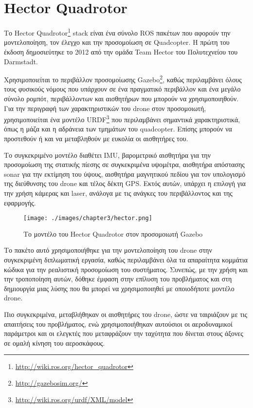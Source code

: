 \section{Hector Quadrotor}
\label{section:hector}

Το Hector Quadrotor\footnote{\href{http://wiki.ros.org/hector_quadrotor}{http://wiki.ros.org/hector\_quadrotor}} stack \cite{2012simpar_meyer} είναι ένα σύνολο ROS πακέτων που αφορούν την μοντελοποίηση, τον έλεγχο και την προσομοίωση σε Quadcopter. Η πρώτη του έκδοση δημοσιεύτηκε το 2012 από την ομάδα Team Hector του Πολυτεχνείου του Darmstadt.

Χρησιμοποιείται το περιβάλλον προσομοίωσης Gazebo\footnote{\href{http://gazebosim.org/}{http://gazebosim.org/}}, καθώς περιλαμβάνει όλους τους φυσικούς νόμους που υπάρχουν σε ένα πραγματικό περιβάλλον και ένα μεγάλο σύνολο ρομπότ, περιβάλλοντων και αισθητήρων που μπορούν να χρησιμοποιηθούν. Για την περιγραφή των χαρακτηριστικών του drone στον προσομοιωτή, χρησιμοποιείται ένα μοντέλο URDF\footnote{\href{http://wiki.ros.org/urdf/XML/model}{http://wiki.ros.org/urdf/XML/model}} που περιλαμβάνει σημαντικά χαρακτηριστικά, όπως η μάζα και η αδράνεια των τμημάτων του quadcopter. Επίσης μπορούν να προστεθούν ή και να μεταβληθούν με ευκολία οι αισθητήρες του.

Το συγκεκριμένο μοντέλο διαθέτει IMU, βαρομετρικό αισθητήρα για την προσομοίωση της στατικής πίεσης σε συγκεκριμένα υψομέτρα, αισθητήρα απόστασης sonar για την εκτίμηση του ύψους, αισθητήρα μαγνητικού πεδίου για τον υπολογισμό της διεύθυνσης του drone και τέλος δέκτη GPS. Εκτός αυτών, υπάρχει η επιλογή για την χρήση κάμερας και laser, ανάλογα με τις ανάγκες του περιβάλλοντος και της εφαρμογής.

\begin{figure}[!ht]
    \centering
    \texttt{[image: ./images/chapter3/hector.png]}
    \caption{Το μοντέλο του Hector Quadrotor στον προσομοιωτή Gazebo} 
    \label{fig:hector}
\end{figure}

Το πακέτο αυτό χρησιμοποιήθηκε για την μοντελοποίηση του drone στην συγκεκριμένη διπλωματική εργασία, καθώς περιλαμβάνει όλα τα απαραίτητα κομμάτια κώδικα για την ρεαλιστική προσομοίωση του συστήματος. Συνεπώς, με την χρήση και την τροποποίηση αυτών, δόθηκε έμφαση στην επίλυση του προβλήματος και στη δημιουργία μιας λύσης που θα μπορεί να χρησιμοποιηθεί με οποιοδήποτε μοντέλο drone. 

Πιο συγκεκριμένα, μεταβλήθηκαν οι αισθητήρες του drone, ώστε να ταιριάζουν με τις απαιτήσεις του προβλήματος, ενώ χρησιμοποιήθηκαν αυτούσιοι οι αεροδυναμικοί παράμετροι και οι ελεγκτές που μεταφράζουν την ταχύτητα που δίνεται στους άξονες σε ομαλή κίνηση του αεροσκάφους.